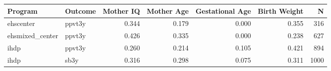\begin{table}[ht]
\centering
\begin{tabular}{llrrrrr}
  \hline
Program & Outcome & Mother IQ & Mother Age & Gestational Age & Birth Weight & N \\ 
  \hline
ehscenter & ppvt3y & 0.344 & 0.179 & 0.000 & 0.355 & 316 \\ 
  ehsmixed\_center & ppvt3y & 0.426 & 0.335 & 0.000 & 0.238 & 627 \\ 
  ihdp & ppvt3y & 0.260 & 0.214 & 0.105 & 0.421 & 894 \\ 
  ihdp & sb3y & 0.316 & 0.298 & 0.075 & 0.311 & 1000 \\ 
   \hline
\end{tabular}
\end{table}
